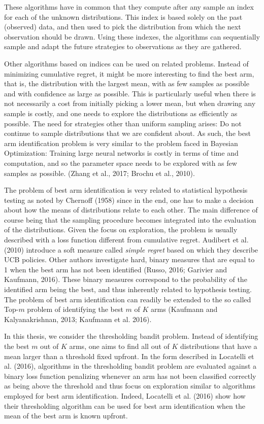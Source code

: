 \documentclass[11pt,]{article}
\begin{document}
These algorithms have in common that they compute after any sample an
index for each of the unknown distributions. This index is based solely
on the past (observed) data, and then used to pick the distribution from
which the next observation should be drawn. Using these indexes, the
algorithms can sequentially sample and adapt the future strategies to
observations as they are gathered.

Other algorithms based on indices can be used on related problems.
Instead of minimizing cumulative regret, it might be more interesting to
find the best arm, that is, the distribution with the largest mean, with
as few samples as possible and with confidence as large as possible.
This is particularly useful when there is not necessarily a cost from
initially picking a lower mean, but when drawing any sample is costly,
and one needs to explore the distributions as efficiently as possible.
The need for strategies other than uniform sampling arises: Do not
continue to sample distributions that we are confident about. As such,
the best arm identification problem is very similar to the problem faced
in Bayesian Optimization: Training large neural networks is costly in
terms of time and computation, and so the parameter space needs to be
explored with as few samples as possible. (Zhang et al., 2017; Brochu et
al., 2010).

The problem of best arm identification is very related to statistical
hypothesis testing as noted by Chernoff (1958) since in the end, one has
to make a decision about how the means of distributions relate to each
other. The main difference of course being that the sampling procedure
becomes integrated into the evaluation of the distributions. Given the
focus on exploration, the problem is usually described with a loss
function different from cumulative regret. Audibert et al. (2010)
introduce a soft measure called \emph{simple regret} based on which they
describe UCB policies. Other authors investigate hard, binary measures
that are equal to 1 when the best arm has not been identified (Russo,
2016; Garivier and Kaufmann, 2016). These binary measures correspond to
the probability of the identified arm being the best, and thus
inherently related to hypothesis testing. The problem of best arm
identification can readily be extended to the so called Top-\(m\)
problem of identifying the best \(m\) of \(K\) arms (Kaufmann and
Kalyanakrishnan, 2013; Kaufmann et al. 2016).

In this thesis, we consider the thresholding bandit problem. Instead of
identifying the best \(m\) out of \(K\) arms, one aims to find all out
of \(K\) distributions that have a mean larger than a threshold fixed
upfront. In the form described in Locatelli et al. (2016), algorithms in
the thresholding bandit problem are evaluated against a binary loss
function penalizing whenever an arm has not been classified correctly as
being above the threshold and thus focus on exploration similar to
algorithms employed for best arm identification. Indeed, Locatelli et
al. (2016) show how their thresholding algorithm can be used for best
arm identification when the mean of the best arm is known upfront.
\end{document}
